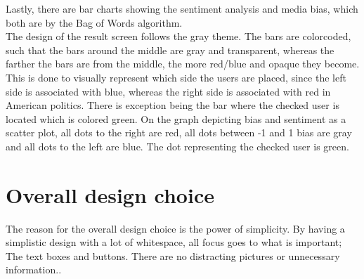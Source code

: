 
Lastly, there are bar charts showing the sentiment analysis and media bias,
which both are by the Bag of Words algorithm. \\

The design of the result screen follows the gray theme. The bars are colorcoded,
such that the bars around the middle are gray and transparent, whereas the
farther the bars are from the middle, the more red/blue and opaque they become.
This is done to visually represent which side the users are placed, since the
left side is associated with blue, whereas the right side is associated with red
in American politics. There is exception being the bar where the checked user is
located which is colored green. On the graph depicting bias and sentiment as a
scatter plot, all dots to the right are red, all dots between -1 and 1 bias are
gray and all dots to the left are blue. The dot representing the checked user is
green.

\section{Overall design choice}
The reason for the overall design choice is the power of simplicity. By having a
simplistic design with a lot of whitespace, all focus goes to what is
important; The text boxes and buttons. There are no distracting
pictures or unnecessary information.\citep[p. 26 \& 32]{WebUI}.\\